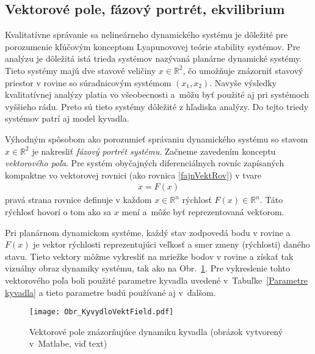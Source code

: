 \documentclass[a4paper, 10pt, ]{article}
\begin{document}
\subsection{Vektorové pole, fázový portrét, ekvilibrium}

Kvalitatívne správanie sa nelineárneho dynamického systému je dôležité pre porozumenie kľúčovým konceptom Lyapunovovej teórie stability systémov. Pre analýzu je dôležitá istá trieda systémov nazývaná planárne dynamické systémy. Tieto systémy majú dve stavové veličiny $x \in \mathbb{R}^2$, čo umožňuje znázorniť stavový priestor v rovine so súradnicovým systémom $(x_1, x_2)$. Navyše výsledky kvalitatívnej analýzy platia vo všeobecnosti a~môžu byť použité aj pri systémoch vyššieho rádu. Preto sú tieto systémy dôležité z hľadiska analýzy. Do tejto triedy systémov patrí aj model kyvadla.

Výhodným spôsobom ako porozumieť správaniu dynamického systému so stavom $x \in \mathbb{R}^2$ je nakresliť \emph{fázový portrét systému}. Začneme zavedením konceptu \emph{vektorového poľa}. Pre systém obyčajných diferenciálnych rovníc zapísaných kompaktne vo vektorovej rovnici (ako rovnica \eqref{fajnVektRov}) v tvare
\begin{align}
	\dot{x} = F(x)
\end{align}
pravá strana rovnice definuje v každom $x \in \mathbb{R}^n$ rýchlosť $F(x) \in \mathbb{R}^n$. Táto rýchlosť hovorí o tom ako sa $x$ mení a~môže byť reprezentovaná vektorom.

Pri planárnom dynamickom systéme, každý stav zodpovedá bodu v rovine a $F(x)$ je vektor rýchlosti reprezentujúci veľkosť a smer zmeny (rýchlosti) daného stavu. Tieto vektory môžme vykresliť na mriežke bodov v rovine a získať tak vizuálny obraz dynamiky systému, tak ako na Obr.~\ref{Vektorové pole znázorňujúce dynamiku kyvadla}. Pre vykreslenie tohto vektorového poľa boli použité parametre kyvadla uvedené v~Tabuľke~\ref{Parametre kyvadla} a tieto parametre budú používané aj v~ďalšom.



\begin{figure}[t]
\centering

	\texttt{[image: Obr\_KyvydloVektField.pdf]}

	\vspace{-7mm}

	\caption{Vektorové pole znázorňujúce dynamiku kyvadla (obrázok vytvorený v~Matlabe, viď text)}

	\label{Vektorové pole znázorňujúce dynamiku kyvadla}
\end{figure}
\end{document}
